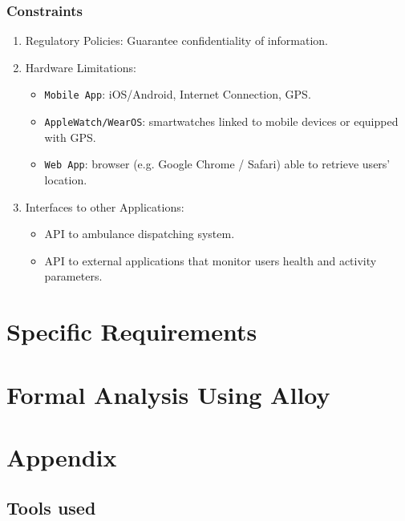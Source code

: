 \documentclass[12pt,a4paper]{article}
\begin{document}
			\subsubsection{Constraints}
				\begin{enumerate}
					\item Regulatory Policies:
							Guarantee confidentiality of information.
					\item Hardware Limitations: 
						\begin{itemize}
							\item \texttt{Mobile App}: iOS/Android, Internet Connection, GPS.
							\item \texttt{AppleWatch/WearOS}: smartwatches linked to mobile devices or equipped with GPS.
							\item \texttt{Web App}: browser (e.g. Google Chrome / Safari) able to retrieve users' location.
						\end{itemize}
					\item Interfaces to other Applications: 
						\begin{itemize}
							\item API to ambulance dispatching system.
							\item API to external applications that monitor users health and activity parameters.
						\end{itemize}
				\end{enumerate}
		
	\newpage
	\section{Specific Requirements}
	
	\newpage
	\section{Formal Analysis Using Alloy}

	\newpage
	\section{Appendix}
	\subsection{Tools used}
	
\end{document}
